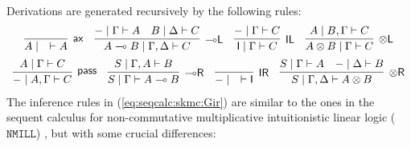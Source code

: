 \documentclass[sn-mathphys-num]{sn-jnl}%
\newcommand{\vd}{\vdash}
\newcommand{\tl}{\otimes \mathsf{L}}
\newcommand{\tr}{\otimes\mathsf{R}}
\newcommand{\pass}{\mathsf{pass}}
\newcommand{\unitl}{\mathsf{IL}}
\newcommand{\unitr}{\mathsf{IR}}
\newcommand{\ax}{\mathsf{ax}}
\newcommand{\ot}{\otimes}
\newcommand{\lolli}{\multimap}
\newcommand{\lleft}{{\lolli}\mathsf{L}}
\newcommand{\lright}{{\lolli}\mathsf{R}}
\newcommand{\I}{\mathsf{I}}
\newcommand{\NMILL}{$\mathtt{NMILL}$}
\theoremstyle{thmstyleone}%
\theoremstyle{thmstyletwo}%
\theoremstyle{thmstylethree}%
\begin{document}
Derivations are generated recursively by the following rules:
\begin{equation}\label{eq:seqcalc:skmc:Gir}
	  \begin{array}{c}
		\infer[\ax]{A \mid \quad \vd A}{}
		\quad
		\infer[\lleft]{A \lolli B \mid \Gamma , \Delta \vd C}{
		  {-} \mid \Gamma \vd A
		  &
		  B \mid \Delta \vd C
		}
		\quad
		\infer[\unitl]{\I \mid \Gamma \vd C}{{-} \mid \Gamma \vd C}
		\quad
		\infer[\tl]{A \ot B \mid \Gamma \vd C}{A \mid B , \Gamma \vd C}
		\\[5pt]
    \infer[\pass]{{-} \mid A , \Gamma \vd C}{A \mid \Gamma \vd C}
		\quad
		\infer[\lright]{S \mid \Gamma \vd A \lolli B}{S \mid \Gamma , A \vd B}
		\quad
		\infer[\unitr]{{-} \mid \quad \vd \I}{}
		\quad
		\infer[\tr]{S \mid \Gamma , \Delta \vd A \ot B}{
		  S \mid \Gamma \vd A
		  &
		  {-} \mid \Delta \vd B
		}
	  \end{array}
	\end{equation}
The inference rules in (\ref{eq:seqcalc:skmc:Gir}) are similar to the ones in the sequent calculus for non-commutative multiplicative intuitionistic linear logic (\NMILL) \cite{abrusci:noncommutative:1990}, but with some crucial differences: 
\end{document}

